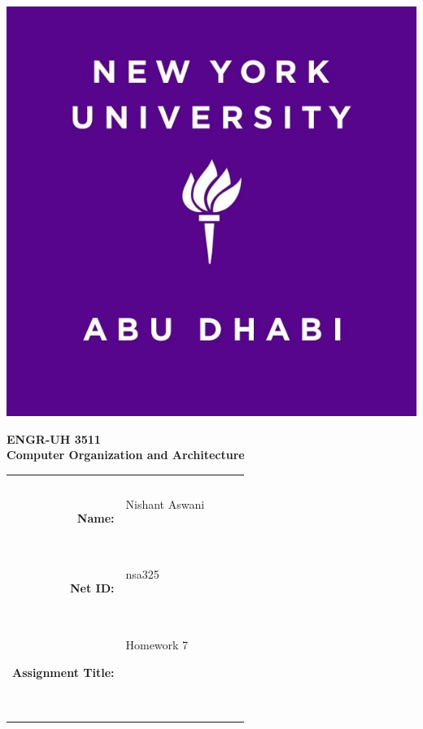 \documentclass[11pt]{exam}
\newcommand{\myname}{Nishant Aswani}
\newcommand{\mynetid}{nsa325}
\newcommand{\myhwtype}{Homework}
\newcommand{\myhwnum}{7}
\newcommand{\mycoursenumber}{ENGR-UH 3511}
\newcommand{\myclassname}{Computer Organization and Architecture}
\begin{document}
\begin{center}
  \includegraphics[scale=0.15]{etc/NYUAD-alt-logo.jpg}
\end{center}

{\vspace{1.5em}}

\begin{center}
    \Huge{\textbf{\mycoursenumber}}\\
    {\vspace{0.5em}}
    \Huge{\textbf{\myclassname}}
\end{center}

{\vspace{10em}}

\begin{center}
  \begin{tabular}{|rp{5.0cm}lll|}
    \hline
    &  &  &  & \\
    &  &  &  & \\
    \Large{\textbf{Name:}} & \Large{\myname}
    
    \  &  &  & \\
    \Large{\textbf{Net ID:}} & \Large{\mynetid}
    
    \  &  &  & \\
    \Large{\textbf{Assignment Title:}} & \Large{\myhwtype{} \myhwnum}
    
    \
    
    \  &  &  & \\
    \hline
  \end{tabular}
\end{center}
\end{document}
